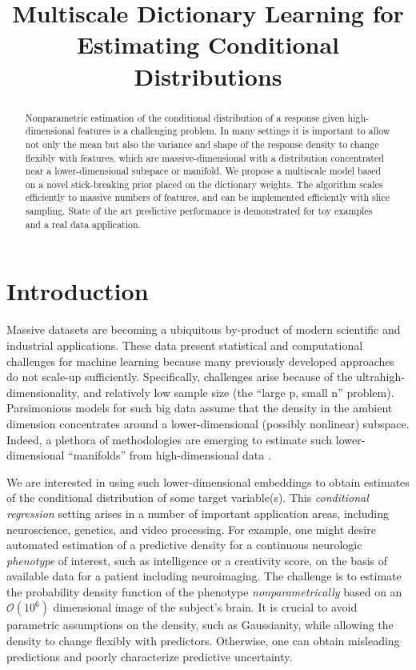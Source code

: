 \documentclass{article} %
\title{Multiscale Dictionary Learning for \\ Estimating Conditional Distributions}
\begin{document}
\renewcommand{\theenumi}{(\roman{enumi})}%


\maketitle

\begin{abstract}
Nonparametric estimation of the conditional distribution of a response given high-dimensional features is a challenging problem.  In many settings it is important to allow not only the mean but also the variance and shape of the response density to change flexibly with features, which are massive-dimensional with a distribution concentrated near a lower-dimensional subspace or manifold.  We propose a  multiscale model based on a novel stick-breaking prior placed on the dictionary weights.  The algorithm scales efficiently to massive numbers of features, and can be implemented efficiently with slice sampling.  State of the art predictive performance is demonstrated for toy examples and a real data application.
\end{abstract}


\section{Introduction}


Massive datasets are becoming a ubiquitous by-product of modern scientific and industrial applications. These data present statistical and computational challenges for machine learning because many previously developed approaches do not scale-up sufficiently.  Specifically, challenges arise because of the ultrahigh-dimensionality, and relatively low sample size (the ``large p, small n'' problem).  Parsimonious models for such big data assume that the density in the ambient dimension concentrates around a lower-dimensional (possibly nonlinear) subspace.  Indeed, a plethora of methodologies are emerging to estimate such lower-dimensional ``manifolds'' from high-dimensional data \cite{Manifold, Maggioni}.  

We are interested in using such lower-dimensional embeddings to obtain estimates of the conditional distribution of some target variable(s).  This \emph{conditional regression} setting arises in a number of important application areas, including neuroscience, genetics, and video processing.  For example, one might desire automated estimation of a predictive density for a continuous neurologic {\em phenotype} of interest, such as intelligence or a creativity score, on the basis of available data for a patient including neuroimaging.  The challenge is to estimate the probability density function of the phenotype {\em nonparametrically} based on an $\mathcal{O}(10^6)$ dimensional image of the subject's brain.  It is crucial to avoid parametric assumptions on the density, such as Gaussianity, while allowing the density to change flexibly with predictors.  Otherwise, one can obtain misleading predictions and poorly characterize predictive uncertainty.
\end{document}
